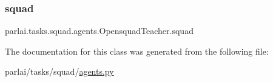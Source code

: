 \subsubsection{\texorpdfstring{squad}{squad}}
{\footnotesize\ttfamily parlai.\+tasks.\+squad.\+agents.\+Opensquad\+Teacher.\+squad}



The documentation for this class was generated from the following file\+:\begin{DoxyCompactItemize}
\item 
parlai/tasks/squad/\hyperlink{parlai_2tasks_2squad_2agents_8py}{agents.\+py}\end{DoxyCompactItemize}
